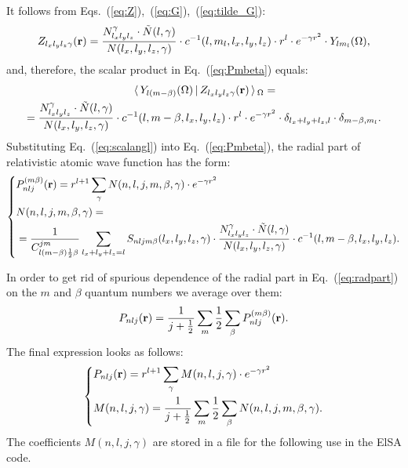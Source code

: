 \documentclass[12pt,openright,twoside,headsepline,bibtotoc]{scrbook}
\begin{document}
It follows from Eqs.~(\ref{eq:Z}),~(\ref{eq:G}),~(\ref{eq:tilde_G}):
%
\begin{equation}
Z_{l_x l_y l_z \gamma}(\mathbf{r}) = \frac{N_{l_x l_y l_z}^\gamma \cdot \tilde N(l, \gamma)}{N(l_x, l_y, l_z, \gamma)} \cdot c^{-1}(l, m_l, l_x, l_y, l_z) \cdot r^l \cdot e^{-\gamma r^2} \cdot Y_{l m_l}(\Omega) ,
\end{equation}
%
and, therefore, the scalar product in Eq.~(\ref{eq:Pmbeta}) equals:
%
\begin{multline}
\,\langle \, Y_{l (m-\beta)}(\Omega) \, | \, Z_{l_x l_y l_z \gamma}(\mathbf{r}) \, \rangle\,_\Omega = 
\\
= \frac{N_{l_x l_y l_z}^\gamma \cdot \tilde N(l, \gamma)}{N(l_x, l_y, l_z, \gamma)} \cdot c^{-1}(l, m-\beta, l_x, l_y, l_z) \cdot r^l \cdot e^{-\gamma r^2} \cdot \delta_{l_x+l_y+l_z, l} \cdot \delta_{m-\beta, m_l} .
\label{eq:scalangl}
\end{multline}
%
Substituting Eq.~(\ref{eq:scalangl}) into Eq.~(\ref{eq:Pmbeta}), the radial part of relativistic atomic wave function has the form:
%
\begin{equation}
\left\{
\begin{aligned}
&P_{n l j}^{(m \beta)}(\mathbf{r}) = r^{l+1} \sum_{\gamma} N(n, l, j, m, \beta, \gamma) \cdot e^{-\gamma r^2}
\\
&N(n, l, j, m, \beta, \gamma) = 
\\
&= \frac{1}{C^{j m}_{l (m-\beta) \frac{1}{2} \beta}} \sum_{l_x+l_y+l_z = l} S_{n l j m \beta}(l_x, l_y, l_z, \gamma) \cdot \frac{N_{l_x l_y l_z}^\gamma \cdot \tilde N(l, \gamma)}{N(l_x, l_y, l_z, \gamma)} \cdot c^{-1}(l, m-\beta, l_x, l_y, l_z) .
\end{aligned}
\right.
\label{eq:radpart}
\end{equation}
%

In order to get rid of spurious dependence of the radial part in Eq.~(\ref{eq:radpart}) on the $m$ and $\beta$ quantum numbers we average over them:
%
\begin{equation}
P_{n l j}(\mathbf{r}) = \frac{1}{j+\frac{1}{2}} \sum_m \frac{1}{2} \sum_\beta P_{n l j}^{(m \beta)}(\mathbf{r}) .
\end{equation}
%
The final expression looks as follows:
%
\begin{equation}
\left\{
\begin{aligned}
&P_{n l j}(\mathbf{r}) = r^{l+1} \sum_{\gamma} M(n, l, j, \gamma) \cdot e^{-\gamma r^2}
\\
&M(n, l, j, \gamma) = \frac{1}{j+\frac{1}{2}} \sum_m \frac{1}{2} \sum_\beta N(n, l, j, m, \beta, \gamma) .
\end{aligned}
\right.
\end{equation}
%
The coefficients $M(n, l, j, \gamma)$ are stored in a file for the following use in the ElSA code. 
\end{document}
